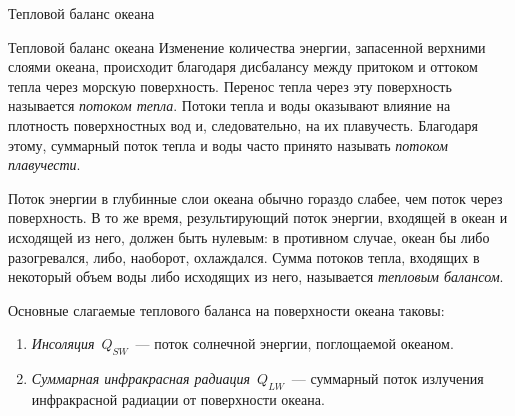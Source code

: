\begin{chapter}{Тепловой баланс океана}
\begin{section}{Тепловой баланс океана}
Изменение количества энергии, запасенной верхними слоями океана, происходит
благодаря дисбалансу между притоком и оттоком тепла через морскую 
поверхность. Перенос тепла через эту поверхность называется 
\emph{потоком тепла}. Потоки тепла и воды оказывают влияние на плотность
поверхностных вод и, следовательно, на их плавучесть. Благодаря этому,
суммарный поток тепла и воды часто принято называть \emph{потоком плавучести}.
%

Поток энергии в глубинные слои океана обычно гораздо слабее, чем поток через
поверхность. В то же время, результирующий поток энергии, входящей в океан 
и исходящей из него, должен быть нулевым: в противном случае, океан бы либо 
разогревался, либо, наоборот, охлаждался. Сумма потоков тепла, входящих в
некоторый объем воды либо исходящих из него, называется 
\emph{тепловым балансом}.
%

Основные слагаемые теплового баланса на поверхности океана таковы:
%
\begin{enumerate}
\item
\emph{Инсоляция}~$Q_{SW}$~--- поток солнечной энергии, поглощаемой океаном.
%

\item
\emph{Суммарная инфракрасная радиация}~$Q_{LW}$~--- суммарный поток излучения
инфракрасной радиации от поверхности океана.
%


\end{enumerate}
\end{section}
\end{chapter}
